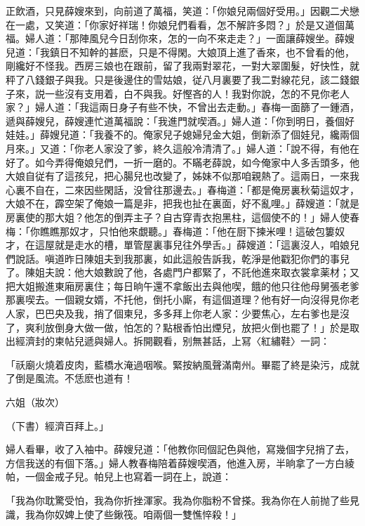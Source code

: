 正飲酒，只見薛嫂來到，向前道了萬福，笑道：「你娘兒兩個好受用。」因觀二犬戀在一處，又笑道：「你家好祥瑞！你娘兒們看看，怎不解許多悶？」於是又道個萬福。婦人道：「那陣風兒今日刮你來，怎的一向不來走走？」一面讓薛嫂坐。薛嫂兒道：「我鎮日不知幹的甚麽，只是不得閑。大娘頂上進了香來，也不曾看的他，剛纔好不怪我。西房三娘也在跟前，留了我兩對翠花，一對大翠圍髮，好快性，就秤了八錢銀子與我。只是後邊住的雪姑娘，従八月裏要了我二對線花兒，該二錢銀子來，説一些沒有支用着，白不與我。好慳吝的人！我對你說，怎的不見你老人家？」婦人道：「我這兩日身子有些不快，不曾出去走動。」春梅一面篩了一鍾酒，遞與薛嫂兒，薛嫂連忙道萬福說：「我進門就喫酒。」婦人道：「你到明日，養個好娃娃。」薛嫂兒道：「我養不的。俺家兒子媳婦兒金大姐，倒新添了個娃兒，纔兩個月來。」又道：「你老人家没了爹，終久這般冷清清了。」婦人道：「說不得，有他在好了。如今弄得俺娘兒們，一折一磨的。不瞞老薛說，如今俺家中人多舌頭多，他大娘自従有了這孩兒，把心腸兒也改變了，姊妹不似那咱親熱了。這兩日，一來我心裏不自在，二來因些閑話，没曾往那邊去。」春梅道：「都是俺房裏秋菊這奴才，大娘不在，霹空架了俺娘一篇是非，把我也扯在裏面，好不亂哩。」薛嫂道：「就是房裏使的那大姐？他怎的倒弄主子？自古穿青衣抱黑柱，這個使不的！」婦人使春梅：「你瞧瞧那奴才，只怕他來覷聽。」春梅道：「他在厨下揀米哩！這破包簍奴才，在這屋就是走水的槽，單管屋裏事兒往外學舌。」薛嫂道：「這裏沒人，咱娘兒們說話。嗔道昨日陳姐夫到我那裏，如此這般告訴我，乾淨是他戳犯你們的事兒了。陳姐夫說：他大娘數說了他，各處門户都緊了，不託他進來取衣裳拿薬材；又把大姐搬進東廂房裏住；每日晌午還不拿飯出去與他喫，餓的他只往他母舅張老爹那裏喫去。一個親女婿，不托他，倒托小廝，有這個道理？他有好一向沒得見你老人家，巴巴央及我，捎了個柬兒，多多拜上你老人家：少要焦心，左右爹也是沒了，爽利放倒身大做一做，怕怎的？點根香怕出煙兒，放把火倒也罷了！」於是取出經濟封的柬帖兒遞與婦人。拆開觀看，别無甚話，上冩〈紅繡鞋〉一詞：

\begin{myquote}
「祅廟火燒着皮肉，藍橋水淹過咽喉。緊按納風聲滿南州。畢罷了終是染污，成就了倒是風流。不恁麽也道有！

六姐（妝次）

\begin{flushright}{\marktext（下書）}經濟百拜上。」\end{flushright}
\end{myquote}

婦人看畢，收了入袖中。薛嫂兒道：「他教你囘個記色與他，寫幾個字兒捎了去，方信我送的有個下落。」婦人教春梅陪着薛嫂喫酒，他進入房，半晌拿了一方白綾帕，一個金戒子兒。帕兒上也寫着一詞在上，說道：

\begin{myquote}
「我為你耽驚受怕，我為你折挫渾家。我為你脂粉不曾搽。我為你在人前抛了些見識，我為你奴婢上使了些鍬筏。咱兩個一雙憔悴殺！」
\end{myquote}

